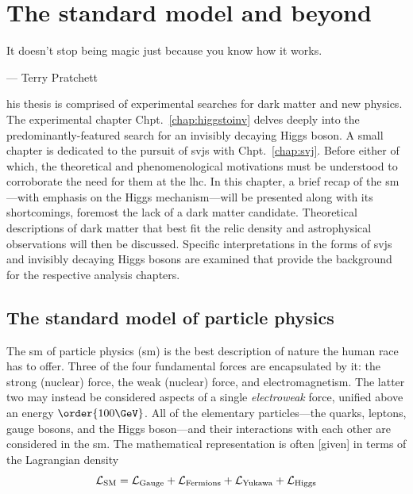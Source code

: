 \chapter{The standard model and beyond}  %
\label{chap:theory}

\epigraph{It doesn’t stop being magic just because you know how it works.}{--- Terry Pratchett}

his thesis is comprised of experimental searches for dark matter and new physics. The experimental chapter Chpt.~\ref{chap:higgstoinv} delves deeply into the predominantly-featured search for an invisibly decaying Higgs boson. A small chapter is dedicated to the pursuit of \glspl{svj} with Chpt.~\ref{chap:svj}. Before either of which, the theoretical and phenomenological motivations must be understood to corroborate the need for them at the \acrlong{lhc}. In this chapter, a brief recap of the \acrlong{sm}---with emphasis on the Higgs mechanism---will be presented along with its shortcomings, foremost the lack of a dark matter candidate. Theoretical descriptions of dark matter that best fit the relic density and astrophysical observations will then be discussed. Specific interpretations in the forms of \glspl{svj} and invisibly decaying Higgs bosons are examined that provide the background for the respective analysis chapters.




\section{The standard model of particle physics}
\label{sec:standardmodel}


The \acrlong{sm} of particle physics (\acrshort{sm}) is the best description of nature the human race has to offer. Three of the four fundamental forces are encapsulated by it: the strong (nuclear) force, the weak (nuclear) force, and electromagnetism. The latter two may instead be considered aspects of a single \emph{electroweak} force, unified above an energy $\order{\text{100}\GeV}$. All of the elementary particles---the quarks, leptons, gauge bosons, and the Higgs boson---and their interactions with each other are considered in the \acrlong{sm}. The mathematical representation is often [given] in terms of the Lagrangian density
\begin{equation}
\mathcal{L}_{\mathrm{SM}} = \mathcal{L}_{\mathrm{Gauge}} + \mathcal{L}_{\mathrm{Fermions}} + \mathcal{L}_{\mathrm{Yukawa}} + \mathcal{L}_{\mathrm{Higgs}} \\
\label{eq:sm_lagrangian_compressed}
\end{equation}

